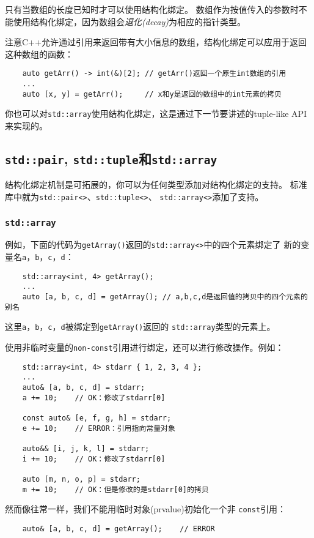 只有当数组的长度已知时才可以使用结构化绑定。
数组作为按值传入的参数时不能使用结构化绑定，因为数组会\emph{退化(decay)}为相应的指针类型。

注意C++允许通过引用来返回带有大小信息的数组，结构化绑定可以应用于返回这种数组的函数：
\begin{lstlisting}
    auto getArr() -> int(&)[2]; // getArr()返回一个原生int数组的引用
    ...
    auto [x, y] = getArr();     // x和y是返回的数组中的int元素的拷贝
\end{lstlisting}
你也可以对\texttt{std::array}使用结构化绑定，这是通过下一节要讲述的tuple-like API来实现的。

\subsection{\texttt{std::pair}, \texttt{std::tuple}和\texttt{std::array}}
结构化绑定机制是可拓展的，你可以为任何类型添加对结构化绑定的支持。
标准库中就为\texttt{std::pair<>}、\texttt{std::tuple<>}、
\texttt{std::array<>}添加了支持。

\subsubsection{\texttt{std::array}}
例如，下面的代码为\texttt{getArray()}返回的\texttt{std::array<>}中的四个元素绑定了
新的变量名\texttt{a}，\texttt{b}，\texttt{c}，\texttt{d}：
\begin{lstlisting}
    std::array<int, 4> getArray();
    ...
    auto [a, b, c, d] = getArray(); // a,b,c,d是返回值的拷贝中的四个元素的别名
\end{lstlisting}
这里\texttt{a}，\texttt{b}，\texttt{c}，\texttt{d}被绑定到\texttt{getArray()}返回的
\texttt{std::array}类型的元素上。

使用非临时变量的\texttt{non-const}引用进行绑定，还可以进行修改操作。例如：
\begin{lstlisting}
    std::array<int, 4> stdarr { 1, 2, 3, 4 };
    ...
    auto& [a, b, c, d] = stdarr;
    a += 10;    // OK：修改了stdarr[0]

    const auto& [e, f, g, h] = stdarr;
    e += 10;    // ERROR：引用指向常量对象

    auto&& [i, j, k, l] = stdarr;
    i += 10;    // OK：修改了stdarr[0]

    auto [m, n, o, p] = stdarr;
    m += 10;    // OK：但是修改的是stdarr[0]的拷贝
\end{lstlisting}
然而像往常一样，我们不能用临时对象(prvalue)初始化一个非 \texttt{const}引用：
\begin{lstlisting}
    auto& [a, b, c, d] = getArray();    // ERROR
\end{lstlisting}


